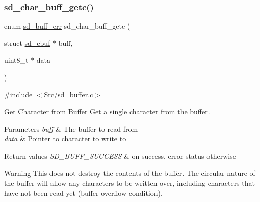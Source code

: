 \subsubsection{\texorpdfstring{sd\+\_\+char\+\_\+buff\+\_\+getc()}{sd\_char\_buff\_getc()}}
{\footnotesize\ttfamily enum \mbox{\hyperlink{group___s_d___buffer___types_ga012d8a07d989f00e3f9c4a2f62743de4}{sd\+\_\+buff\+\_\+err}} sd\+\_\+char\+\_\+buff\+\_\+getc (\begin{DoxyParamCaption}\item[{struct \mbox{\hyperlink{structsd__cbuf}{sd\+\_\+cbuf}} $\ast$}]{buff,  }\item[{uint8\+\_\+t $\ast$}]{data }\end{DoxyParamCaption})}



{\ttfamily \#include $<$\mbox{\hyperlink{sd__buffer_8c}{Src/sd\+\_\+buffer.\+c}}$>$}



Get Character from Buffer Get a single character from the buffer. 


\begin{DoxyParams}{Parameters}
{\em buff} & The buffer to read from \\
\hline
{\em data} & Pointer to character to write to \\
\hline
\end{DoxyParams}

\begin{DoxyRetVals}{Return values}
{\em S\+D\+\_\+\+B\+U\+F\+F\+\_\+\+S\+U\+C\+C\+E\+SS} & on success, error status otherwise \\
\hline
\end{DoxyRetVals}
\begin{DoxyWarning}{Warning}
This does not destroy the contents of the buffer. The circular nature of the buffer will allow any characters to be written over, including characters that have not been read yet (buffer overflow condition).
\end{DoxyWarning}

